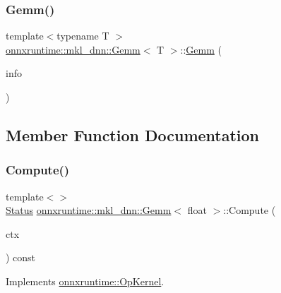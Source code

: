 \subsubsection{\texorpdfstring{Gemm()}{Gemm()}}
{\footnotesize\ttfamily template$<$typename T $>$ \\
\mbox{\hyperlink{classonnxruntime_1_1mkl__dnn_1_1Gemm}{onnxruntime\+::mkl\+\_\+dnn\+::\+Gemm}}$<$ T $>$\+::\mbox{\hyperlink{classonnxruntime_1_1mkl__dnn_1_1Gemm}{Gemm}} (\begin{DoxyParamCaption}\item[{const \mbox{\hyperlink{classonnxruntime_1_1OpKernelInfo}{Op\+Kernel\+Info}} \&}]{info }\end{DoxyParamCaption})\hspace{0.3cm}{\ttfamily [inline]}}



\subsection{Member Function Documentation}
\mbox{\label{classonnxruntime_1_1mkl__dnn_1_1Gemm_ade0e8638249049ff3c42b8eb09b9d4ce}} 
\subsubsection{\texorpdfstring{Compute()}{Compute()}\hspace{0.1cm}{\footnotesize\ttfamily [1/2]}}
{\footnotesize\ttfamily template$<$$>$ \\
\mbox{\hyperlink{classonnxruntime_1_1common_1_1Status}{Status}} \mbox{\hyperlink{classonnxruntime_1_1mkl__dnn_1_1Gemm}{onnxruntime\+::mkl\+\_\+dnn\+::\+Gemm}}$<$ float $>$\+::Compute (\begin{DoxyParamCaption}\item[{\mbox{\hyperlink{classonnxruntime_1_1OpKernelContext}{Op\+Kernel\+Context}} $\ast$}]{ctx }\end{DoxyParamCaption}) const\hspace{0.3cm}{\ttfamily [virtual]}}



Implements \mbox{\hyperlink{classonnxruntime_1_1OpKernel_a9eca8656a78b1b3ab9d3351a12798650}{onnxruntime\+::\+Op\+Kernel}}.

